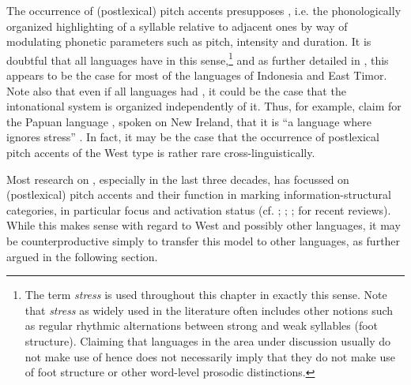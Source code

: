 \documentclass[output=paper
,modfonts
,nonflat]{langsci/langscibook}
\begin{document}
The occurrence of (postlexical) pitch accents presupposes , i.e. the phonologically organized highlighting of a syllable relative to adjacent ones by way of modulating phonetic parameters such as pitch, intensity and duration. It is doubtful that all languages have  in this sense,\footnote{The term \textit{stress} is used throughout this chapter in exactly this sense. Note that \textit{stress} as widely used in the literature often includes other notions such as regular rhythmic alternations between strong and weak syllables (foot structure). Claiming that  languages in the area under discussion usually do not make use of  hence does not necessarily imply that they do not make use of foot structure or other word-level prosodic distinctions.} and as further detailed in , this appears to be the case for most of the  languages of Indonesia and East Timor. Note also that even if all languages had , it could be the case that the intonational system is organized independently of it. Thus, for example, \citet{Lindström2005} claim for the Papuan language , spoken on New Ireland, that it is “a language where  ignores stress” \citep[839]{Lindström2005}. In fact, it may be the case that the occurrence of postlexical pitch accents of the West  type is rather rare cross-linguistically.

Most research on , especially in the last three decades, has focussed on (postlexical) pitch accents and their function in marking information-structural categories, in particular focus and activation status (cf. \citealt{Ladd2008}; \citealt{Wagner2010}; \citealt{BaumannKü2015}; \citealt{Zimmermann2016} for recent reviews). While this makes sense with regard to West  and possibly other  languages, it may be counterproductive simply to transfer this model to other languages, as further argued in the following section.
\end{document}
